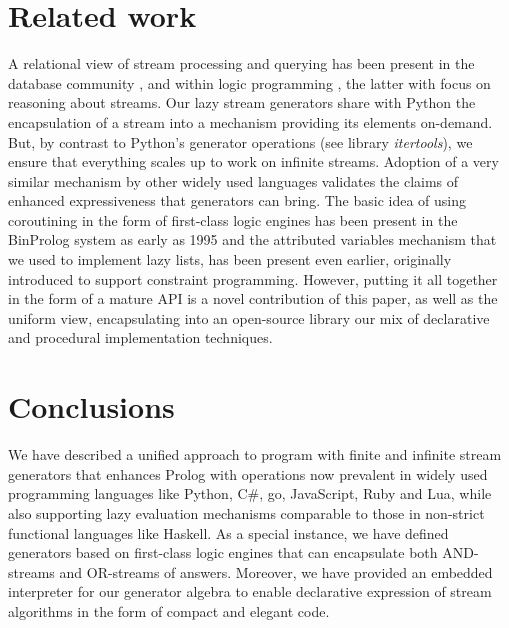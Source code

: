 \documentclass[submission,copyright,creativecommons]{eptcs}
\begin{document}
\section{Related work}\label{rel}

\begin{comment}
Maybe?
\BI 
\I some history - see
\cite{tarau:parimp99,tarau:cl2000,iclp08:inter,ciclops08:pINTER}
\cite{coord11tarau}
\cite{bp2011}
\I work on delimited continuations \cite{delim}, hookable disjunction \cite{tor}
\I work on pipelines \cite{pipelines}
\EI
\end{comment}

A relational view of stream processing and querying has been 
present in the database community 
\cite{Law11,Babcock02},
and 
within logic programming 
\cite{Beck15}, %
the latter with focus on
reasoning about streams.
Our lazy stream generators share with Python  \cite{pyref} the encapsulation of
a stream into a mechanism providing its elements on-demand. But, by contrast to
Python's generator operations (see library {\em itertools}), we ensure 
that everything scales up to work on infinite streams.
Adoption of a very similar mechanism by other widely
used languages validates the claims of 
enhanced expressiveness  that generators can bring.
The basic idea of using coroutining in the form of first-class logic engines
has been present in the BinProlog system  \cite{bp2011} as early as 1995 and
the attributed variables mechanism \cite{holz92} that we used to implement 
lazy lists, has been present even earlier, originally introduced to support constraint programming. However, putting it all together
in the form of a mature API is a 
 novel contribution of this paper,
 as well as the uniform view, encapsulating into an open-source library 
 our mix of declarative and procedural implementation techniques. 
 
\section{Conclusions}\label{conc}

We have described a unified approach to program with finite and infinite stream
generators that enhances Prolog with operations now prevalent in widely used
programming languages like Python, C\#, go, JavaScript, Ruby and Lua, while
also supporting lazy evaluation mechanisms comparable to those in non-strict
functional languages like Haskell. As a special instance, we have defined
generators based on first-class logic engines that can encapsulate both
AND-streams and OR-streams of answers.  Moreover, we have provided an embedded
interpreter for our generator algebra to enable declarative expression of
stream algorithms in the form of compact and elegant code.
% 
\end{document}

